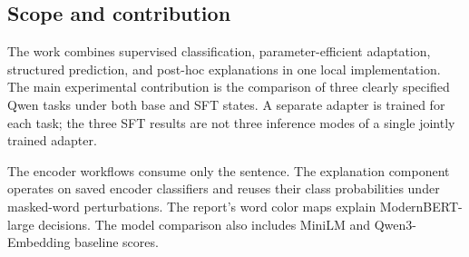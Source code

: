 \subsection{Scope and contribution}
The work combines supervised classification, parameter-efficient adaptation, structured prediction, and post-hoc explanations in one local implementation. The main experimental contribution is the comparison of three clearly specified Qwen tasks under both base and SFT states. A separate adapter is trained for each task; the three SFT results are not three inference modes of a single jointly trained adapter.

The encoder workflows consume only the sentence. The explanation component operates on saved encoder classifiers and reuses their class probabilities under masked-word perturbations. The report's word color maps explain ModernBERT-large decisions. The model comparison also includes MiniLM and Qwen3-Embedding baseline scores.
